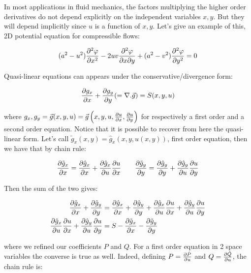 In most applications in fluid mechanics, the factors multiplying the higher order derivatives do not depend explicitly on the independent variables $x,y$. But they will depend implicitly since $u$ is a function of $x,y$. Let's give an example of this, 2D potential equation for compressible flows: 

\begin{equation}
(a^2 - u^2)\frac{\partial^2\varphi}{\partial x^2} - 2uv \frac{\partial ^2 \varphi}{\partial x \partial y} + (a^2 - v^2) \frac{\partial ^2 \varphi}{\partial y^2} = 0
\end{equation}

Quasi-linear equations can appears under the conservative/divergence form:

\begin{equation}
\frac{\partial g_x}{\partial x} + \frac{\partial g_y}{\partial y} (=\nabla .\vec{g}) = S(x,y,u)
\end{equation}

where $g_x, g_y = \vec{g}(x,y,u) = \vec{g}\left(x,y,u,\frac{\partial u}{\partial x}, \frac{\partial u}{\partial y}\right)$ for respectively a first order and a second order equation. Notice that it is possible to recover from here the quasi-linear form. Let's call $\tilde{g}_x (x,y) = \hat{g}_x(x,y,u(x,y))$, first order equation, then we have that by chain rule: 

\begin{equation}
\frac{\partial \tilde{g}_x}{\partial x} = \frac{\partial \hat{g}_x}{\partial x}  +\frac{\partial \hat{g}_x }{\partial u}\frac{\partial u}{\partial x} \qquad \frac{\partial \tilde{g}_y}{\partial y} = \frac{\partial \hat{g}_y}{\partial y}  +\frac{\partial \hat{g}_y }{\partial u}\frac{\partial u}{\partial y}
\end{equation}

Then the sum of the two gives: 

\begin{equation}
\begin{aligned}
\frac{\partial \tilde{g}_x}{\partial x} + \frac{\partial \tilde{g}_y}{\partial y} &= \frac{\partial \hat{g}_x}{\partial x} + \frac{\partial \hat{g}_y}{\partial y}  +\frac{\partial \hat{g}_x }{\partial u}\frac{\partial u}{\partial x} +\frac{\partial \hat{g}_y }{\partial u}\frac{\partial u}{\partial y}  \\
\frac{\partial \hat{g} _x}{\partial u} \frac{\partial u}{\partial x} + \frac{\partial \hat{g}_y}{\partial u} \frac{\partial u}{\partial y} &= S - \frac{\partial \tilde{g}_x}{\partial x} - \frac{\partial \tilde{g}_y}{\partial y}
\end{aligned}
\end{equation}

where we refined our coefficients $P$ and $Q$. For a first order equation in 2 space variables the converse is true as well. Indeed, defining $P= \frac{\partial \hat{P}}{\partial u}$ and $Q= \frac{\partial \hat{Q}}{\partial u}$, the chain rule is: 

